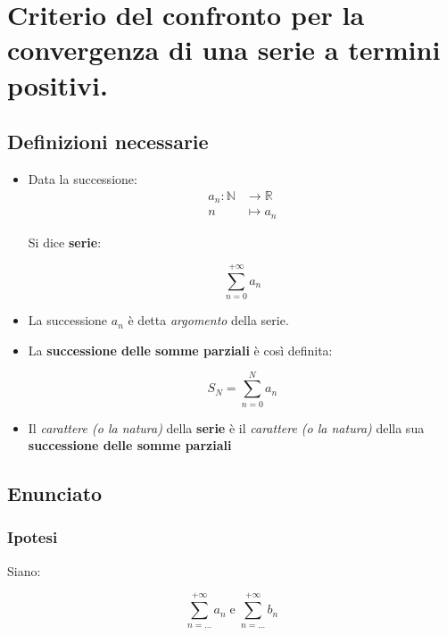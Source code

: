 \documentclass[../dimostrazioni]{subfiles}
\begin{document}
    \chapter{Criterio del confronto per la convergenza di una serie a termini positivi.}
    \label{serieconfronto}

        \section*{Definizioni necessarie}

            \begin{itemize}
                \item Data la successione:
                        \begin{align*}
                            a_n : \mathbb{N} &\longrightarrow \mathbb{R}\\
                            n &\longmapsto a_n 
                        \end{align*}
    
                        Si dice \textbf{serie}:

                        \[  \sum_{n=0}^{+\infty} a_n\]

                \item La successione \(a_n\) è detta \emph{argomento} della serie.
                \item La \textbf{successione delle somme parziali} è così definita:
                      
                        \[  S_N = \sum_{n=0}^{N} a_n\]
                    
                \item Il  \emph{carattere (o la natura)} della \textbf{serie} è il \emph{carattere (o la natura)} della sua \textbf{successione delle somme parziali}
            \end{itemize}
           

        \section*{Enunciato}

            \subsection*{Ipotesi}

                Siano:

                \[  \sum_{n=\dots}^{+\infty} a_n \; \text{e} \;  \sum_{n=\dots}^{+\infty} b_n   \]
\end{document}
